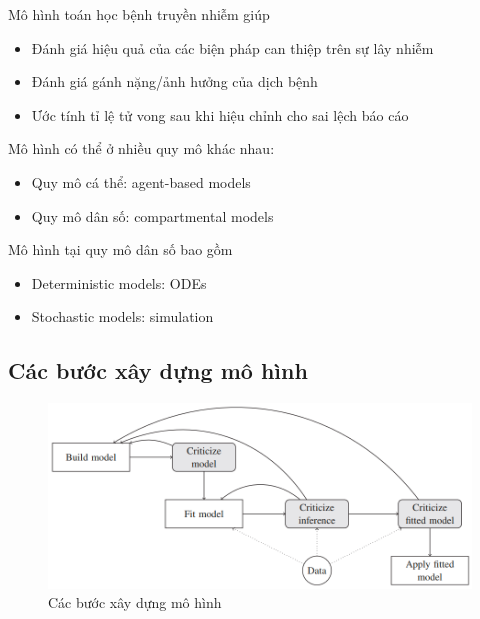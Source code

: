 \documentclass[
]{book}
\providecommand{\tightlist}{%
  \setlength{\itemsep}{0pt}\setlength{\parskip}{0pt}}
\begin{document}
Mô hình toán học bệnh truyền nhiễm giúp

\begin{itemize}
\tightlist
\item
  Đánh giá hiệu quả của các biện pháp can thiệp trên sự lây nhiễm
\item
  Đánh giá gánh nặng/ảnh hưởng của dịch bệnh
\item
  Ước tính tỉ lệ tử vong sau khi hiệu chỉnh cho sai lệch báo cáo
\end{itemize}

Mô hình có thể ở nhiều quy mô khác nhau:

\begin{itemize}
\tightlist
\item
  Quy mô cá thể: agent-based models
\item
  Quy mô dân số: compartmental models
\end{itemize}

Mô hình tại quy mô dân số bao gồm

\begin{itemize}
\tightlist
\item
  Deterministic models: ODEs
\item
  Stochastic models: simulation
\end{itemize}

\hypertarget{cuxe1c-bux1b0ux1edbc-xuxe2y-dux1ef1ng-muxf4-huxecnh}{%
\subsection{Các bước xây dựng mô hình}\label{cuxe1c-bux1b0ux1edbc-xuxe2y-dux1ef1ng-muxf4-huxecnh}}

\begin{figure}

{\centering \includegraphics[width=1\linewidth]{figures/BayesDisTransModels_02} 

}

\caption{Các bước xây dựng mô hình}\label{fig:unnamed-chunk-9}
\end{figure}
\end{document}
